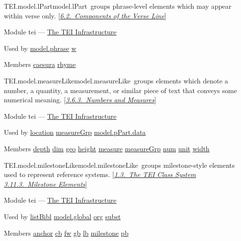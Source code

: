 \begin{reflist}
\item[]\begin{specHead}{TEI.model.lPart}{model.lPart} groups phrase-level elements which may appear within verse only. [\textit{\hyperref[VESE]{6.2.\ Components of the Verse Line}}]\end{specHead} 
    \item[{Module}]
  tei — \hyperref[ST]{The TEI Infrastructure}
    \item[{Used by}]
  \hyperref[TEI.model.phrase]{model.phrase} \hyperref[TEI.w]{w}
    \item[{Members}]
  \hyperref[TEI.caesura]{caesura} \hyperref[TEI.rhyme]{rhyme}
\end{reflist}  
\begin{reflist}
\item[]\begin{specHead}{TEI.model.measureLike}{model.measureLike} groups elements which denote a number, a quantity, a measurement, or similar piece of text that conveys some numerical meaning. [\textit{\hyperref[CONANU]{3.6.3.\ Numbers and Measures}}]\end{specHead} 
    \item[{Module}]
  tei — \hyperref[ST]{The TEI Infrastructure}
    \item[{Used by}]
  \hyperref[TEI.location]{location} \hyperref[TEI.measureGrp]{measureGrp} \hyperref[TEI.model.pPart.data]{model.pPart.data}
    \item[{Members}]
  \hyperref[TEI.depth]{depth} \hyperref[TEI.dim]{dim} \hyperref[TEI.geo]{geo} \hyperref[TEI.height]{height} \hyperref[TEI.measure]{measure} \hyperref[TEI.measureGrp]{measureGrp} \hyperref[TEI.num]{num} \hyperref[TEI.unit]{unit} \hyperref[TEI.width]{width}
\end{reflist}  
\begin{reflist}
\item[]\begin{specHead}{TEI.model.milestoneLike}{model.milestoneLike} groups milestone-style elements used to represent reference systems. [\textit{\hyperref[STEC]{1.3.\ The TEI Class System}} \textit{\hyperref[CORS5]{3.11.3.\ Milestone Elements}}]\end{specHead} 
    \item[{Module}]
  tei — \hyperref[ST]{The TEI Infrastructure}
    \item[{Used by}]
  \hyperref[TEI.listBibl]{listBibl} \hyperref[TEI.model.global]{model.global} \hyperref[TEI.org]{org} \hyperref[TEI.subst]{subst}
    \item[{Members}]
  \hyperref[TEI.anchor]{anchor} \hyperref[TEI.cb]{cb} \hyperref[TEI.fw]{fw} \hyperref[TEI.gb]{gb} \hyperref[TEI.lb]{lb} \hyperref[TEI.milestone]{milestone} \hyperref[TEI.pb]{pb}
\end{reflist}  

